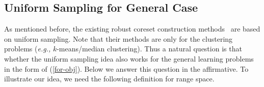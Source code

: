\documentclass{article}
\begin{document}

\subsection{Uniform Sampling for General Case}
\label{sec-wu}
As mentioned before, the existing robust coreset construction methods~\cite{FeldmanL11,HuangJLW18} are based on uniform sampling. Note that their methods are only for the clustering problems ({\em e.g.,} $k$-means/median clustering). Thus a natural question is that whether the uniform sampling idea also works for the general  learning problems in the form of (\ref{for-obj}). Below we answer this question in the affirmative.  To illustrate our idea, we need the following  definition for range space. 
\end{document}
